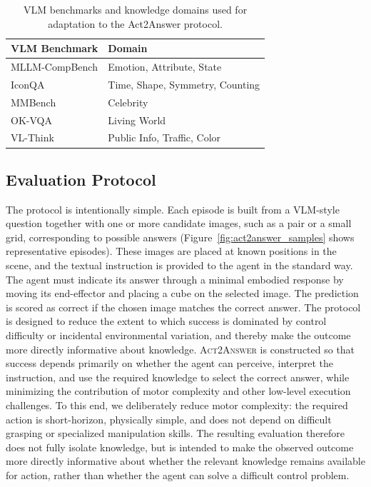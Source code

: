 \documentclass[11pt]{article}
\begin{document}
\begin{table}[b]
\centering
\small
\begin{tabular}{ll}
\toprule
\textbf{VLM Benchmark} & \textbf{Domain} \\
\midrule
MLLM-CompBench & Emotion, Attribute, State \\
IconQA & Time, Shape, Symmetry, Counting \\
MMBench & Celebrity \\
OK-VQA & Living World \\
VL-Think & Public Info, Traffic, Color \\
\bottomrule
\end{tabular}
\caption{VLM benchmarks and knowledge domains used for adaptation to the Act2Answer protocol.}
\label{tab:vlm2vla_benchmarks}
\end{table}

\subsection{Evaluation Protocol}
The protocol is intentionally simple. Each episode is built from a VLM-style question together with one or more candidate images, such as a pair or a small grid, corresponding to possible answers (Figure~\ref{fig:act2answer_samples} shows representative episodes). These images are placed at known positions in the scene, and the textual instruction is provided to the agent in the standard way. The agent must indicate its answer through a minimal embodied response by moving its end-effector and placing a cube on the selected image. The prediction is scored as correct if the chosen image matches the correct answer. The protocol is designed to reduce the extent to which success is dominated by control difficulty or incidental environmental variation, and thereby make the outcome more directly informative about knowledge. \textsc{Act2Answer} is constructed so that success depends primarily on whether the agent can perceive, interpret the instruction, and use the required knowledge to select the correct answer, while minimizing the contribution of motor complexity and other low-level execution challenges. To this end, we deliberately reduce motor complexity: the required action is short-horizon, physically simple, and does not depend on difficult grasping or specialized manipulation skills. The resulting evaluation therefore does not fully isolate knowledge, but is intended to make the observed outcome more directly informative about whether the relevant knowledge remains available for action, rather than whether the agent can solve a difficult control problem.
\end{document}
